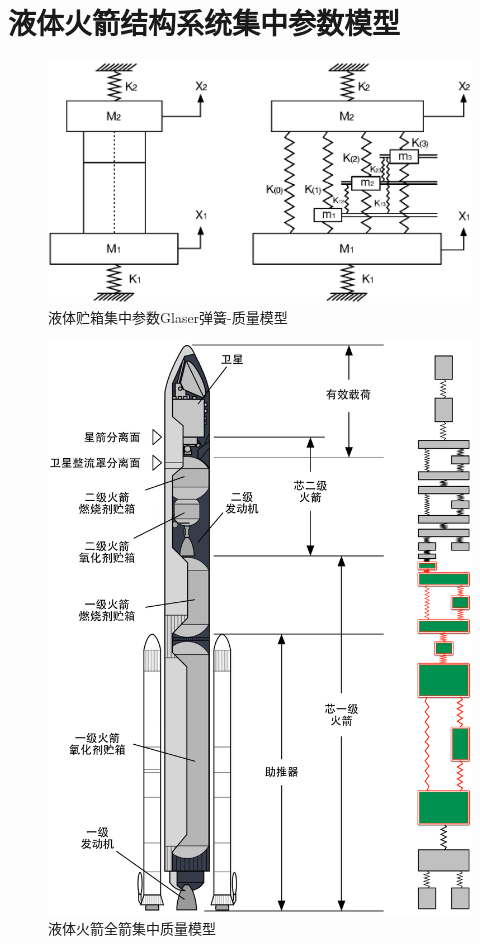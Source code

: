 \section{液体火箭结构系统集中参数模型}
\label{sec:Lumped-Rocket-Structural-System}
\begin{figure}[!htb]
  \centering
  \includegraphics[width=.8\linewidth]{Lumped-Mass-Spring-Glaser}
  \caption{液体贮箱集中参数Glaser弹簧-质量模型}\label{Lumped-Mass-Spring-Glaser}
\end{figure}

\begin{figure}[p]
  \centering
  \centerline{\includegraphics[width=.95\linewidth]{Whole-Rocket-Model}}
  \caption{液体火箭全箭集中质量模型}\label{Whole-Rocket-Model}
\end{figure}

